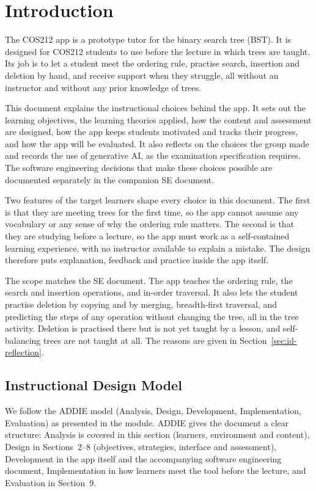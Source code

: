 \section{Introduction}\label{sec:id-intro}

The COS212 app is a prototype tutor for the binary search tree (BST). It is designed for COS212 students to use before the lecture in which trees are taught. Its job is to let a student meet the ordering rule, practise search, insertion and deletion by hand, and receive support when they struggle, all without an instructor and without any prior knowledge of trees.

This document explains the instructional choices behind the app. It sets out the learning objectives, the learning theories applied, how the content and assessment are designed, how the app keeps students motivated and tracks their progress, and how the app will be evaluated. It also reflects on the choices the group made and records the use of generative AI, as the examination specification requires. The software engineering decisions that make these choices possible are documented separately in the companion SE document.

Two features of the target learners shape every choice in this document. The first is that they are meeting trees for the first time, so the app cannot assume any vocabulary or any sense of why the ordering rule matters. The second is that they are studying before a lecture, so the app must work as a self-contained learning experience, with no instructor available to explain a mistake. The design therefore puts explanation, feedback and practice inside the app itself.

The scope matches the SE document. The app teaches the ordering rule, the search and insertion operations, and in-order traversal. It also lets the student practise deletion by copying and by merging, breadth-first traversal, and predicting the steps of any operation without changing the tree, all in the tree activity. Deletion is practised there but is not yet taught by a lesson, and self-balancing trees are not taught at all. The reasons are given in Section~\ref{sec:id-reflection}.

\subsection{Instructional Design Model}
We follow the ADDIE model (Analysis, Design, Development, Implementation, Evaluation) as presented in the module. ADDIE gives the document a clear structure: Analysis is covered in this section (learners, environment and content), Design in Sections~2--8 (objectives, strategies, interface and assessment), Development in the app itself and the accompanying software engineering document, Implementation in how learners meet the tool before the lecture, and Evaluation in Section~9.
 
